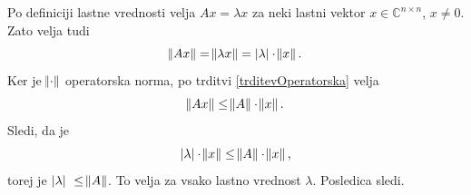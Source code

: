 \documentclass[mat1]{fmfdelo}
\newcommand{\C}{\mathbb C}
\begin{document}
\begin{dokaz}
    Po definiciji lastne vrednosti velja $A x = \lambda x$ za neki lastni vektor $x \in \C^{n \times n}$, $x \neq 0 $. Zato velja tudi
    \begin{equation}
        \norm{A x} = \norm{\lambda x} = |\lambda|\cdot \norm{x}.
    \end{equation}    
    Ker je $\norm{\cdot}$ operatorska norma, po trditvi \ref{trditevOperatorska} velja
    \begin{equation}
        \norm{A x} \leq \norm{A} \cdot \norm{x}.
    \end{equation}
    Sledi, da je
    \begin{equation}
        |\lambda|\cdot \norm{x} \leq \norm{A} \cdot \norm{x},
    \end{equation}
    torej je $|\lambda| \leq \norm{A}$. To velja za vsako lastno vrednost $\lambda$. Posledica sledi.
\end{dokaz}
\end{document}
